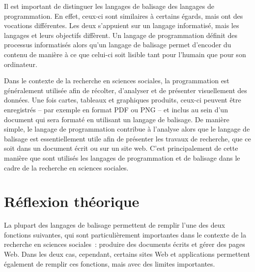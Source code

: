 \documentclass[
  letterpaper,
]{scrbook}
\begin{document}
Il est important de distinguer les langages de balisage des langages de
programmation. En effet, ceux-ci sont similaires à certains égards, mais
ont des vocations différentes. Les deux s'appuient sur un langage
informatisé, mais les langages et leurs objectifs diffèrent. Un langage
de programmation définit des processus informatisés alors qu'un langage
de balisage permet d'encoder du contenu de manière à ce que celui-ci
soit lisible tant pour l'humain que pour son ordinateur.

Dans le contexte de la recherche en sciences sociales, la programmation
est généralement utilisée afin de récolter, d'analyser et de présenter
visuellement des données. Une fois cartes, tableaux et graphiques
produits, ceux-ci peuvent être enregistrés -- par exemple en format PDF
ou PNG -- et inclus au sein d'un document qui sera formaté en utilisant
un langage de balisage. De manière simple, le langage de programmation
contribue à l'analyse alors que le langage de balisage est
essentiellement utile afin de présenter les travaux de recherche, que ce
soit dans un document écrit ou sur un site web. C'est principalement de
cette manière que sont utilisés les langages de programmation et de
balisage dans le cadre de la recherche en sciences sociales.

\hypertarget{ruxe9flexion-thuxe9orique-1}{%
\section{Réflexion théorique}\label{ruxe9flexion-thuxe9orique-1}}

La plupart des langages de balisage permettent de remplir l'une des deux
fonctions suivantes, qui sont particulièrement importantes dans le
contexte de la recherche en sciences sociales~: produire des documents
écrits et gérer des pages Web. Dans les deux cas, cependant, certains
sites Web et applications permettent également de remplir ces fonctions,
mais avec des limites importantes.
\end{document}
